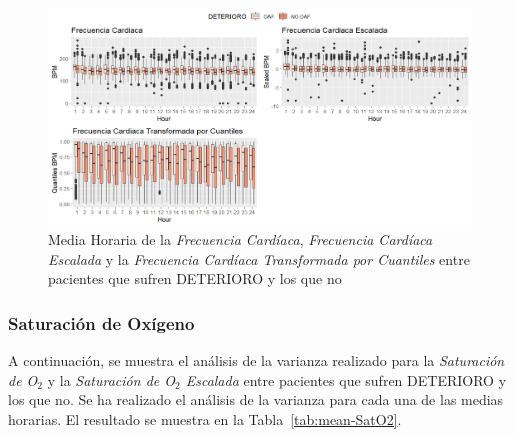 \newpage
\thispagestyle{empty}
\begin{landscape}
\begin{figure}[H]
    \centering
    \includegraphics[scale = 0.68]{./img/fc-boxplot-mean.png}
    \caption{Media Horaria de la \textit{Frecuencia Cardíaca}, \textit{Frecuencia Cardíaca Escalada} y la \textit{Frecuencia Cardíaca Transformada por Cuantiles} entre pacientes que sufren DETERIORO y los que no}
    \label{fig:fc-boxplot-mean}
\end{figure}
\end{landscape}
\restoregeometry

\subsubsection{Saturación de Oxígeno}

A continuación, se muestra el análisis de la varianza realizado para la \textit{Saturación de O$_2$} y la \textit{Saturación de O$_2$ Escalada} entre pacientes que sufren DETERIORO y los que no. Se ha realizado el análisis de la varianza para cada una de las medias horarias. El resultado se muestra en la Tabla~\ref{tab:mean-SatO2}.

